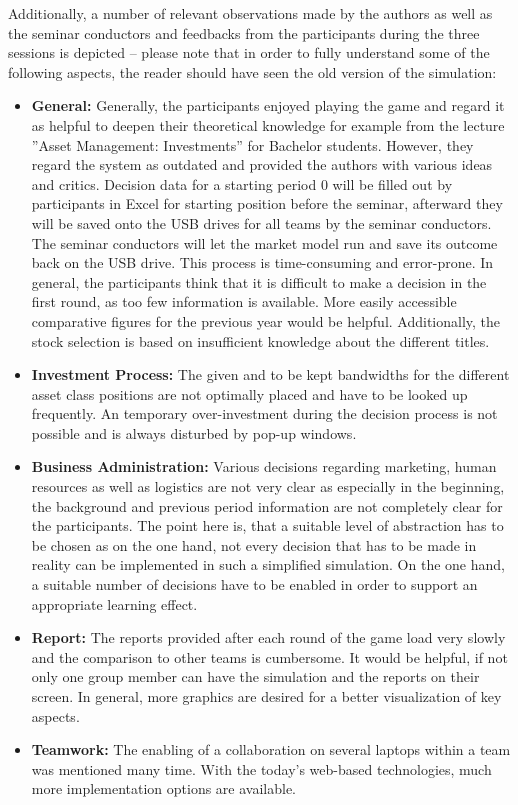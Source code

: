 Additionally, a number of relevant observations made by the authors as well as the seminar conductors and feedbacks from the participants during the three sessions is depicted – please note that in order to fully understand some of the following aspects, the reader should have seen the old version of the simulation:
\begin{itemize}
  \item \textbf{General:} Generally, the participants enjoyed playing the game and regard it as helpful to deepen their theoretical knowledge for example from the lecture ''Asset Management: Investments'' for Bachelor students. However, they regard the system as outdated and provided the authors with various ideas and critics. Decision data for a starting period 0 will be filled out by participants in Excel for starting position before the seminar, afterward they will be saved onto the USB drives for all teams by the seminar conductors. The seminar conductors will let the market model run and save its outcome back on the USB drive. This process is time-consuming and error-prone. In general, the participants think that it is difficult to make a decision in the first round, as too few information is available. More easily accessible comparative figures for the previous year would be helpful. Additionally, the stock selection is based on insufficient knowledge about the different titles.
  \item \textbf{Investment Process:} The given and to be kept bandwidths for the different asset class positions are not optimally placed and have to be looked up frequently. An temporary over-investment during the decision process is not possible and is always disturbed by pop-up windows.
  \item \textbf{Business Administration:} Various decisions regarding marketing, human resources as well as logistics are not very clear as especially in the beginning, the background and previous period information are not completely clear for the participants. The point here is, that a suitable level of abstraction has to be chosen as on the one hand, not every decision that has to be made in reality can be implemented in such a simplified simulation. On the one hand, a suitable number of decisions have to be enabled in order to support an appropriate learning effect.
  \item \textbf{Report:} The reports provided after each round of the game load very slowly and the comparison to other teams is cumbersome. It would be helpful, if not only one group member can have the simulation and the reports on their screen. In general, more graphics are desired for a better visualization of key aspects.
  \item \textbf{Teamwork:} The enabling of a collaboration on several laptops within a team was mentioned many time. With the today’s web-based technologies, much more implementation options are available.
\end{itemize}

